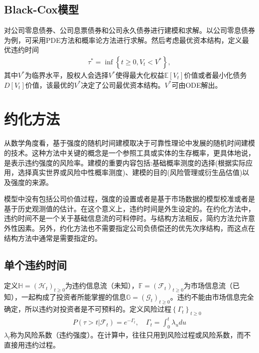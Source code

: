 \documentclass{article}
\begin{document}
\subsection{Black-Cox模型}
对公司零息债券、公司息票债券和公司永久债券进行建模和求解。以公司零息债券为例，可采用PDE方法和概率论方法进行求解。然后考虑最优资本结构，定义最优违约时间
\begin{eqnarray}
  \tau^* = \inf\left\{t\ge 0, V_t<V^*\right\},
\end{eqnarray}
其中$V^*$为临界水平，股权人会选择$V^*$使得最大化权益$\mathbb{E}[V_t]$价值或者最小化债务$D[V_t]$价值，该最优的$V^*$决定了公司最优资本结构。$V^*$可由ODE解出。






\section{约化方法}
从数学角度看，基于强度的随机时间建模取决于可靠性理论中发展的随机时间建模的技术。这种方法中关键的概念是一个参照工具或实体的生存概率，更具体地说，是表示违约强度的风险率。建模的重要内容包括:基础概率测度的选择(根据实际应用，选择真实世界或风险中性概率测度)、建模的目的(风险管理或衍生品估值)以及强度的来源。

模型中没有包括公司价值过程，强度的设置或者是基于市场数据的模型校准或者是基于历史观测值的估计。在这个意义上，违约时间是外生设定的。在约化方法中，违约时间不是一个关于基础信息流的可料停时。与结构方法相反，简约方法允许意外性因素。另外，约化方法也不需要指定公司负债偿还的优先次序结构，而这点在结构方法中通常是需要指定的。

\subsection{单个违约时间}
定义$\mathbb{H} = (\mathcal{H}_t)_{t\ge0}$为违约信息流（未知），$\mathbb{F} = (\mathcal{F}_t)_{t\ge0}$为市场信息流（已知），一起构成了投资者所能掌握的信息$\mathbb{G} = (\mathcal{G}_t)_{t\ge0}$。违约不能由市场信息完全确定，所以违约对投资者是不可预料的。定义风险过程$\left\{{\Gamma}_t\right\}_{t\geq0}$
\begin{eqnarray}
P\left(\tau>t\left|\mathcal{F}_t\right.\right)=e^{-{\Gamma}_t},\quad {\Gamma}_t=\int_{0}^{t}{\lambda_udu}
\end{eqnarray}
$\lambda_t$称为风险系数（违约强度）。在计算中，往往只用到风险过程或风险系数，而不直接用违约过程。
\end{document}
